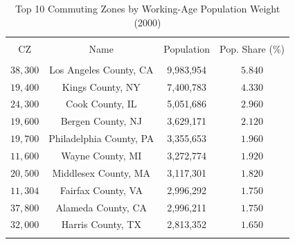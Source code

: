 
\begin{table}[!htbp] \centering 
  \caption{Top 10 Commuting Zones by Working-Age Population Weight (2000)} 
  \label{tab:top10_pop} 
\begin{tabular}{@{\extracolsep{5pt}} cccc} 
\\[-1.8ex]\hline 
\hline \\[-1.8ex] 
CZ & Name & Population & Pop. Share (\%) \\ 
\hline \\[-1.8ex] 
$38,300$ & Los Angeles County, CA & 9,983,954 & $5.840$ \\ 
$19,400$ & Kings County, NY & 7,400,783 & $4.330$ \\ 
$24,300$ & Cook County, IL & 5,051,686 & $2.960$ \\ 
$19,600$ & Bergen County, NJ & 3,629,171 & $2.120$ \\ 
$19,700$ & Philadelphia County, PA & 3,355,653 & $1.960$ \\ 
$11,600$ & Wayne County, MI & 3,272,774 & $1.920$ \\ 
$20,500$ & Middlesex County, MA & 3,117,301 & $1.820$ \\ 
$11,304$ & Fairfax County, VA & 2,996,292 & $1.750$ \\ 
$37,800$ & Alameda County, CA & 2,996,211 & $1.750$ \\ 
$32,000$ & Harris County, TX & 2,813,352 & $1.650$ \\ 
\hline \\[-1.8ex] 
\end{tabular} 
\end{table} 
